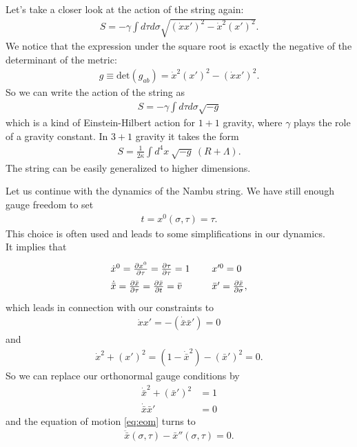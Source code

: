 \begin{example}[$1+1$ Gravity]
Let's take a closer look at the action of the string again:
\begin{align}
S = - \gamma \int d\tau d\sigma \sqrt{(\dot{x} x')^2 - \dot{x}^2 (x')^2}.
\end{align}
We notice that the expression under the square root is exactly the negative of the determinant of the metric:
\begin{align}
g \equiv \mbox{det}(g_{ab}) = \dot{x}^2(x')^2 - (\dot{x}x')^2.
\end{align}
So we can write the action of the string as
\begin{align}
S = - \gamma \int d\tau d\sigma \sqrt{- g}
\end{align}
which is a kind of Einstein-Hilbert action for $1+1$ gravity, where $\gamma$ plays the role of a gravity constant. In $3+1$ gravity it takes the form 
\begin{align}
S = \frac{1}{2 \kappa} \int d^4 x \ \sqrt{- g} \ (R + \Lambda).
\end{align}
The string can be easily generalized to higher dimensions.
\end{example}


Let us continue with the dynamics of the Nambu string. We have still enough gauge freedom to set 
\begin{align}
t = x^0(\sigma, \tau) = \tau.
\end{align}
This choice is often used and leads to some simplifications in our dynamics. \\

It implies that
\begin{align}
\arraycolsep=1.4pt\def\arraystretch{1.5}
\begin{array}{ll}
\dot{x}^0 = \frac{\partial x^0}{\partial \tau} = \frac{\partial \tau}{\partial \tau} = 1 \ \ \ & \ \ \ x'^0 = 0 \\
\dot{\bar{x}} = \frac{\partial \bar{x}}{\partial \tau} = \frac{\partial \bar{x}}{\partial t} = \bar{v} \ \ \ & \ \ \ \bar{x}' = \frac{\partial \bar{x}}{\partial \sigma},
\end{array} 
\end{align}
which leads in connection with our constraints to
\begin{align}
\dot{x} x' = - (\dot{\bar{x}} \bar{x}') = 0
\end{align}
and 
\begin{align}
\dot{x}^2 + (x')^2 = (1 - \dot{\bar{x}}^2) - (\bar{x}')^2 = 0.
\end{align}
So we can replace our orthonormal gauge conditions by
\begin{align}
\dot{\bar{x}}^2 + (\bar{x}')^2 &= 1 \\
\dot{\bar{x}} \bar{x}' &= 0
\end{align}
and the equation of motion \eqref{eq:eom} turns to
\begin{align}
\ddot{\bar{x}}(\sigma, \tau) - \bar{x}''(\sigma, \tau) = 0.
\end{align}

